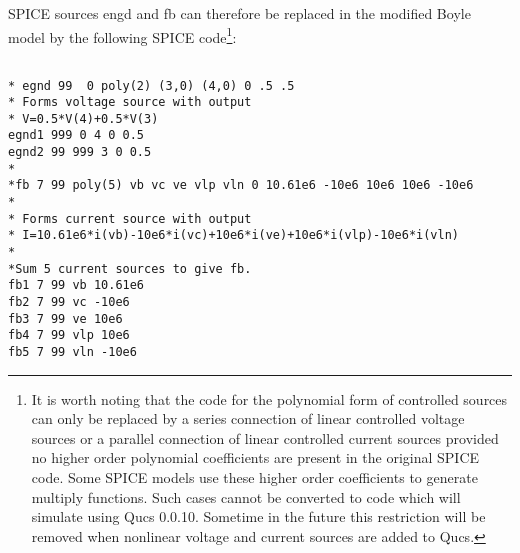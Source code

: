 SPICE sources engd and fb can therefore be replaced in the modified Boyle model by the following SPICE code\footnote{It is worth noting that the code for the polynomial form of controlled sources can only be replaced by a series connection of linear controlled voltage sources or a parallel connection of linear controlled current sources provided no higher order polynomial coefficients are present in the original SPICE code.  Some SPICE models use these higher order coefficients to generate multiply functions.  Such cases cannot be converted to code which will simulate using Qucs 0.0.10. Sometime in the future this restriction will be removed when nonlinear voltage and current sources are added to Qucs.}:

\begin{verbatim}

* egnd 99  0 poly(2) (3,0) (4,0) 0 .5 .5
* Forms voltage source with output
* V=0.5*V(4)+0.5*V(3)
egnd1 999 0 4 0 0.5
egnd2 99 999 3 0 0.5
*
*fb 7 99 poly(5) vb vc ve vlp vln 0 10.61e6 -10e6 10e6 10e6 -10e6
*
* Forms current source with output
* I=10.61e6*i(vb)-10e6*i(vc)+10e6*i(ve)+10e6*i(vlp)-10e6*i(vln)
*
*Sum 5 current sources to give fb.
fb1 7 99 vb 10.61e6
fb2 7 99 vc -10e6
fb3 7 99 ve 10e6
fb4 7 99 vlp 10e6
fb5 7 99 vln -10e6
\end{verbatim} 


